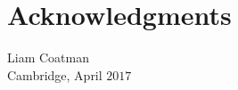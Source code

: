 
\bigskip

\begingroup
\let\clearpage\relax
\let\cleardoublepage\relax
\let\cleardoublepage\relax
\chapter*{Acknowledgments}






\begin{flushright}
Liam Coatman \\
Cambridge, April $2017$
\end{flushright}

\endgroup



